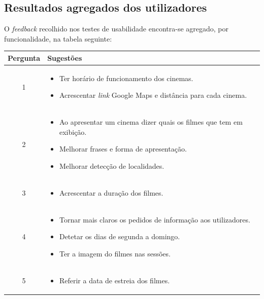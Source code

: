 \documentclass[11pt, a4paper]{article}
\begin{document}
\subsection{Resultados agregados dos utilizadores}
O \textit{feedback} recolhido nos testes de usabilidade encontra-se agregado, por funcionalidade, na tabela
seguinte:

\begin{longtable}{|c|m{12cm}|}
        \hline
        Pergunta & Sugestões\\ \hline
        1 & \begin{itemize}[leftmargin=0.5cm]
            \setlength\itemsep{0em}
            \item Ter horário de funcionamento dos cinemas.
            \item Acrescentar \emph{link} Google Maps e distância para cada cinema.
        \end{itemize}\\ \hline
        2 & \begin{itemize}[leftmargin=0.5cm]
            \setlength\itemsep{0em}
            \item Ao apresentar um cinema dizer quais os filmes que tem em exibição.
            \item Melhorar frases e forma de apresentação.
            \item Melhorar detecção de localidades.
        \end{itemize} \\ \hline
        3 & \begin{itemize}[leftmargin=0.5cm]
            \setlength\itemsep{0em}
            \item Acrescentar a duração dos filmes.
        \end{itemize}\\ \hline
        4 & \begin{itemize}[leftmargin=0.5cm]
            \setlength\itemsep{0em}
            \item Tornar mais claros os pedidos de informação aos utilizadores.
            \item Detetar os dias de segunda a domingo.
            \item Ter a imagem do filmes nas sessões.
        \end{itemize}\\ \hline
        5 & \begin{itemize}[leftmargin=0.5cm]
            \setlength\itemsep{0em}
            \item Referir a data de estreia dos filmes.

\end{itemize}
\end{longtable}
\end{document}

